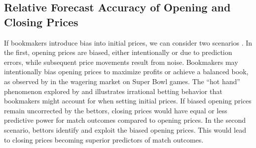 \documentclass[webpdf,modern,medium]{oup-authoring-template}
\theoremstyle{thmstyleone}%
\theoremstyle{thmstyletwo}%
\theoremstyle{thmstylethree}%
\begin{document}
    \subsection{Relative Forecast Accuracy of Opening and Closing Prices}

        If bookmakers introduce bias into initial prices, we can consider two scenarios \citep{gandar1998}. In the first, opening prices are biased, either intentionally or due to prediction errors, while subsequent price movements result from noise.
        Bookmakers may intentionally bias opening prices to maximize profits or achieve a balanced book, as observed by \citet{dare1996} in the wagering market on Super Bowl games. The ``hot hand'' phenomenon explored by \citet{camerer1989} and \citet{brown1993} illustrates irrational betting behavior that bookmakers might account for when setting initial prices. If biased opening prices remain uncorrected by the bettors, closing prices would have equal or less predictive power for match outcomes compared to opening prices. In the second scenario, bettors identify and exploit the biased opening prices. This would lead to closing prices becoming superior predictors of match outcomes.
\end{document}

